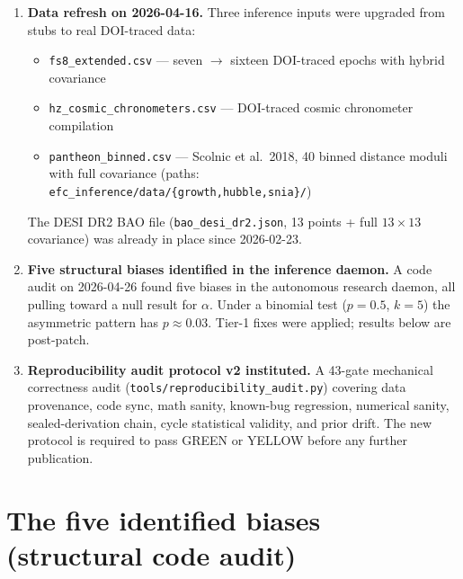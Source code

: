 \documentclass[11pt]{article}
\begin{document}
\begin{enumerate}[leftmargin=*]
\item \textbf{Data refresh on 2026-04-16.} Three inference inputs were
upgraded from stubs to real DOI-traced data:
\begin{itemize}[leftmargin=*]
  \item \texttt{fs8\_extended.csv} ---
        seven $\to$ sixteen DOI-traced epochs with hybrid covariance
  \item \texttt{hz\_cosmic\_chronometers.csv} ---
        DOI-traced cosmic chronometer compilation
  \item \texttt{pantheon\_binned.csv} ---
        Scolnic et al.\ 2018, 40 binned distance moduli with full covariance
        (paths: \texttt{efc\_inference/data/\{growth,hubble,snia\}/})
\end{itemize}
The DESI DR2 BAO file (\texttt{bao\_desi\_dr2.json}, 13 points + full
$13\times13$ covariance) was already in place since 2026-02-23.

\item \textbf{Five structural biases identified in the inference daemon.}
A code audit on 2026-04-26 found five biases in the autonomous research
daemon, all pulling toward a null result for $\alpha$. Under a binomial
test ($p=0.5$, $k=5$) the asymmetric pattern has $p\approx0.03$. Tier-1
fixes were applied; results below are post-patch.

\item \textbf{Reproducibility audit protocol v2 instituted.} A 43-gate
mechanical correctness audit (\texttt{tools/reproducibility\_audit.py})
covering data provenance, code sync, math sanity, known-bug regression,
numerical sanity, sealed-derivation chain, cycle statistical validity,
and prior drift. The new protocol is required to pass GREEN or YELLOW
before any further publication.
\end{enumerate}

\section{The five identified biases (structural code audit)}
\label{sec:biases}
\end{document}
